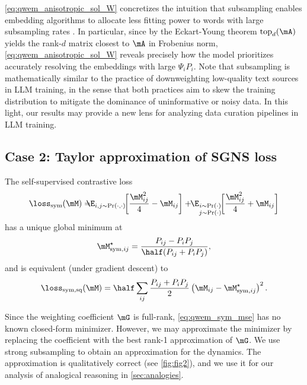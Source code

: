 \cref{eq:qwem_anisotropic_sol_W} concretizes the intuition that subsampling enables embedding algorithms to allocate less fitting power to words with large subsampling rates \citep{mikolov2013distributed}.
In particular, since by the Eckart-Young theorem $\mathrm{top}_d(\mA)$ yields the rank-$d$ matrix closest to $\mA$ in Frobenius norm, \cref{eq:qwem_anisotropic_sol_W} reveals precisely how the model prioritizes accurately resolving the embeddings with large $\Psi_iP_i$. Note that subsampling is mathematically similar to the practice of downweighting low-quality text sources in LLM training, in the sense that both practices aim to skew the training distribution to mitigate the dominance of uninformative or noisy data. In this light, our results may provide a new lens for analyzing data curation pipelines in LLM training.

\subsection{Case 2: Taylor approximation of SGNS loss}

\begin{corollary}
    The self-supervised contrastive loss
    \begin{equation}
        \losssym(\M) = \!\!\!\!\! \E_{i,j\sim \Pr(\cdot,\cdot)}\!\bigg[\frac{\M_{ij}^2}{4} -\M_{ij}\bigg]
        + \!\! \E_{\substack{i\sim \Pr(\cdot)\\j\sim \Pr(\cdot)}}\!\bigg[{\frac{\M_{ij}^2}{4} +\M_{ij}}\bigg]
        \label{eq:qwem_sym}
    \end{equation}
    has a unique global minimum at
    \begin{equation}
        \Mstarsymij = \frac{P_{ij}-P_i P_j}{\half(P_{ij} + P_i P_j)},
    \end{equation}
    and is equivalent (under gradient descent) to
    \begin{equation}
        \loss_\mathrm{sym,sq}(\M) = \half\sum_{ij} \frac{P_{ij} + P_i P_j}{2} \left(\M_{ij}-\Mstarsymij\right)^2.
    \label{eq:qwem_sym_mse}
    \end{equation}
\end{corollary}

Since the weighting coefficient $\mG$ is full-rank, \cref{eq:qwem_sym_mse} has no known closed-form minimizer. However, we may approximate the minimizer by replacing the coefficient with the best rank-1 approximation of $\mG$. We use strong subsampling to obtain an approximation for the dynamics. The approximation is qualitatively correct (see \cref{fig:fig2}), and we use it for our analysis of analogical reasoning in \cref{sec:analogies}.

